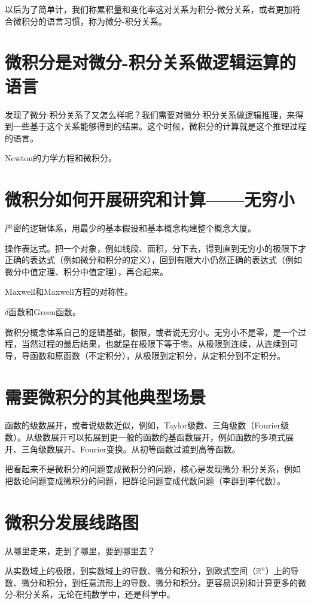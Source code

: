 \documentclass{ctexbook}
\begin{document}
以后为了简单计，我们称累积量和变化率这对关系为积分-微分关系，或者更加符合微积分的语言习惯，称为微分-积分关系。

\section{微积分是对微分-积分关系做逻辑运算的语言}
发现了微分-积分关系了又怎么样呢？我们需要对微分-积分关系做逻辑推理，来得到一些基于这个关系能够得到的结果。这个时候，微积分的计算就是这个推理过程的语言。

Newton的力学方程和微积分。


\section{微积分如何开展研究和计算——无穷小}
严密的逻辑体系，用最少的基本假设和基本概念构建整个概念大厦。

操作表达式。把一个对象，例如线段、面积，分下去，得到直到无穷小的极限下才正确的表达式（例如微分和积分的定义），回到有限大小仍然正确的表达式（例如微分中值定理、积分中值定理），再合起来。

Maxwell和Maxwell方程的对称性。

$\delta$函数和Green函数。

微积分概念体系自己的逻辑基础，极限，或者说无穷小。无穷小不是零，是一个过程，当然过程的最后结果，也就是在极限下等于零。从极限到连续，从连续到可导，导函数和原函数（不定积分），从极限到定积分，从定积分到不定积分。

\section{需要微积分的其他典型场景}
函数的级数展开，或者说级数近似，例如，Taylor级数、三角级数（Fourier级数）。从级数展开可以拓展到更一般的函数的基函数展开，例如函数的多项式展开、三角级数展开、Fourier变换。从初等函数过渡到高等函数。

把看起来不是微积分的问题变成微积分的问题，核心是发现微分-积分关系，例如把数论问题变成微积分的问题，把群论问题变成代数问题（李群到李代数）。

\section{微积分发展线路图}
从哪里走来，走到了哪里，要到哪里去？

从实数域上的极限，到实数域上的导数、微分和积分，到欧式空间（$\mathbb{R}^{n}$）上的导数、微分和积分，到任意流形上的导数、微分和积分。更容易识别和计算更多的微分-积分关系，无论在纯数学中，还是科学中。
\end{document}
